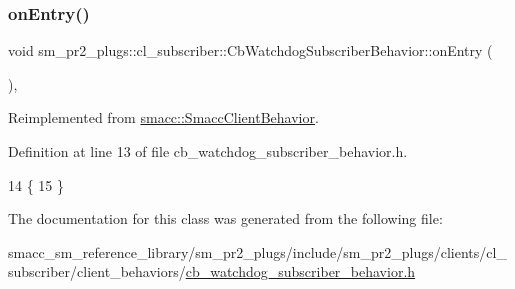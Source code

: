 \subsubsection{\texorpdfstring{on\+Entry()}{onEntry()}}
{\footnotesize\ttfamily void sm\+\_\+pr2\+\_\+plugs\+::cl\+\_\+subscriber\+::\+Cb\+Watchdog\+Subscriber\+Behavior\+::on\+Entry (\begin{DoxyParamCaption}{ }\end{DoxyParamCaption})\hspace{0.3cm}{\ttfamily [inline]}, {\ttfamily [virtual]}}



Reimplemented from \hyperlink{classsmacc_1_1SmaccClientBehavior_a7962382f93987c720ad432fef55b123f}{smacc\+::\+Smacc\+Client\+Behavior}.



Definition at line 13 of file cb\+\_\+watchdog\+\_\+subscriber\+\_\+behavior.\+h.


\begin{DoxyCode}
14     \{
15     \}
\end{DoxyCode}


The documentation for this class was generated from the following file\+:\begin{DoxyCompactItemize}
\item 
smacc\+\_\+sm\+\_\+reference\+\_\+library/sm\+\_\+pr2\+\_\+plugs/include/sm\+\_\+pr2\+\_\+plugs/clients/cl\+\_\+subscriber/client\+\_\+behaviors/\hyperlink{sm__pr2__plugs_2include_2sm__pr2__plugs_2clients_2cl__subscriber_2client__behaviors_2cb__watchdog__subscriber__behavior_8h}{cb\+\_\+watchdog\+\_\+subscriber\+\_\+behavior.\+h}\end{DoxyCompactItemize}
